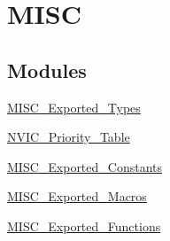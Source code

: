 \hypertarget{group__MISC}{
\section{MISC}
\label{group__MISC}
}
\subsection*{Modules}
\begin{DoxyCompactItemize}
\item 
\hyperlink{group__MISC__Exported__Types}{MISC\_\-Exported\_\-Types}
\item 
\hyperlink{group__NVIC__Priority__Table}{NVIC\_\-Priority\_\-Table}
\item 
\hyperlink{group__MISC__Exported__Constants}{MISC\_\-Exported\_\-Constants}
\item 
\hyperlink{group__MISC__Exported__Macros}{MISC\_\-Exported\_\-Macros}
\item 
\hyperlink{group__MISC__Exported__Functions}{MISC\_\-Exported\_\-Functions}
\end{DoxyCompactItemize}
